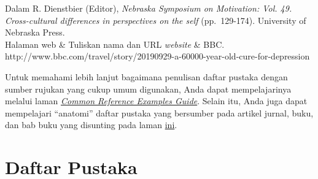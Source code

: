 \documentclass[
  indonesian,
  letterpaper,
]{scrbook}
\begin{document}
\begin{enumerate}
\begin{longtable}[]
  Dalam R. Dienstbier (Editor), \emph{Nebraska Symposium on Motivation:
  Vol. 49. Cross-cultural differences in perspectives on the self}
  (pp.~129-174). University of Nebraska Press. \\
  Halaman web & Tuliskan nama dan URL \emph{website} & BBC.
  http://www.bbc.com/travel/story/20190929-a-60000-year-old-cure-for-depression \\
  \end{longtable}
\end{enumerate}

Untuk memahami lebih lanjut bagaimana penulisan daftar pustaka dengan
sumber rujukan yang cukup umum digunakan, Anda dapat mempelajarinya
melalui laman
\href{https://apastyle.apa.org/instructional-aids/reference-examples.pdf}{\emph{Common
Reference Examples Guide}}. Selain itu, Anda juga dapat mempelajari
``anatomi'' daftar pustaka yang bersumber pada artikel jurnal, buku, dan
bab buku yang disunting pada laman
\href{https://apastyle.apa.org/instructional-aids/reference-guide.pdf}{ini}.


\chapter*{Daftar Pustaka}\label{daftar-pustaka-2}

\end{document}
